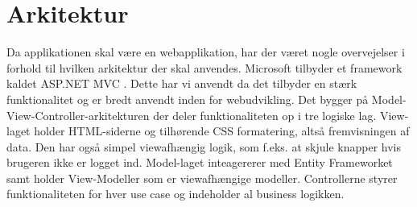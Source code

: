 \section{Arkitektur}
Da applikationen skal være en webapplikation, har der været nogle overvejelser i forhold til hvilken arkitektur der skal anvendes.
Microsoft tilbyder et framework kaldet ASP.NET MVC \citep{aspnetmvcWeb}. Dette har vi anvendt da det tilbyder en stærk funktionalitet og er bredt anvendt inden for webudvikling. Det bygger på Model-View-Controller-arkitekturen der deler funktionaliteten op i tre logiske lag. View-laget holder HTML-siderne og tilhørende CSS formatering, altså fremvisningen af data. Den har også simpel viewafhængig logik, som f.eks. at skjule knapper hvis brugeren ikke er logget ind. Model-laget inteagererer med Entity Frameworket \citep{entityFrameworkWeb} samt holder View-Modeller som er viewafhængige modeller. Controllerne styrer funktionaliteten for hver use case og indeholder al business logikken.